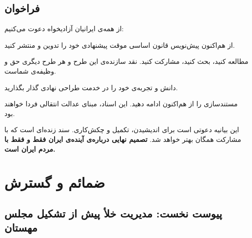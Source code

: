 \documentclass[12pt,a4paper,twoside,openany]{book}
\begin{document}
	\chapter{فراخوان}
	\label{ch:call}
	
	از همه‌ی ایرانیان آزادیخواه دعوت می‌کنیم:
	
	\begin{infobox}[title={\rl{به جریان‌ها، احزاب و ائتلاف‌ها}}]
		از هم‌اکنون پیش‌نویس قانون اساسی موقت پیشنهادی خود را تدوین و منتشر کنید.
	\end{infobox}
	
	\begin{infobox}[title={\rl{به هر شهروند}}]
		مطالعه کنید، بحث کنید، مشارکت کنید. نقد سازنده‌ی این طرح و هر طرح دیگری حق و وظیفه‌ی شماست.
	\end{infobox}
	
	\begin{infobox}[title={\rl{به متخصصان}}]
		دانش و تجربه‌ی خود را در خدمت طراحی نهادی گذار بگذارید.
	\end{infobox}
	
	\begin{infobox}[title={\rl{به فعالان حقوق بشر}}]
		مستندسازی را از هم‌اکنون ادامه دهید. این اسناد، مبنای عدالت انتقالی فردا خواهند بود.
	\end{infobox}
	
	\begin{summarybox}
		این بیانیه دعوتی است برای اندیشیدن، تکمیل و چکش‌کاری. سند زنده‌ای است که با
		مشارکت همگان بهتر خواهد شد. \textbf{تصمیم نهایی درباره‌ی آینده‌ی ایران فقط و فقط
			با مردم ایران است.}
	\end{summarybox}
	
	\part{ضمائم و گسترش}
	\label{part:appendices}
	
	\chapter{پیوست نخست: مدیریت خلأ پیش از تشکیل مجلس مهستان}
	\label{app:preassembly}
	
\end{document}
